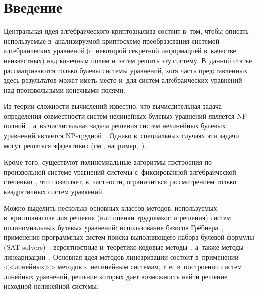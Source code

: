 
  
\vspace*{-1pt}



\thispagestyle{headings}

\begin{multicols}{2}

\label{st\stat}


\section{Введение}

\vspace*{-2pt}

Центральная идея алгебраического криптоанализа состоит в~том, чтобы описать 
используемые в~анализируемой криптосхеме преобразования сис\-те\-мой алгебраических 
уравнений (с~некоторой сек\-рет\-ной информацией в~качестве неизвестных) над\linebreak 
конечным полем и~затем решить эту систему.
В~данной статье рассматриваются только булевы системы уравнений, хотя часть 
пред\-став\-лен\-ных здесь результа\-тов может иметь место и~для сис\-тем ал\-геб\-ра\-и\-че\-ских 
уравнений над произвольными конечными полями.

Из теории сложности вычислений известно, что вычислительная задача определения 
совместности систем нелинейных булевых уравнений является NP-пол\-ной~\cite{GJ1982, GT2017}, 
а~вычислительная задача решения систем нелинейных булевых 
уравнений является NP-труд\-ной~\cite{GJ1982,GT2017}.
Однако в~специальных случаях эти задачи могут решаться эффективно (см., 
например,~\cite{GT2017,Smi2000}).

Кроме того, существуют полиномиальные алгоритмы построения по произвольной 
системе уравнений системы с~фиксированной алгебраической 
степенью~\cite[\S{}.2]{Bard2009}, что позволяет, в~частности, ограничиться 
рассмотрением только квадратичных систем уравнений.

Можно выделить несколько основных классов методов, используемых в~криптоанализе 
для решения (или оценки трудоемкости решения) систем полиномиальных булевых 
уравнений:
использование базисов Грёбнера~\cite[section~12.2]{Bard2009}, применение 
программных систем поиска выполняющего набора булевой формулы 
(SAT-solvers)~\cite{BCJ2007}, вероятностные и~тео\-ре\-ти\-ко-ко\-до\-вые 
методы~\cite{LSSYa2015}, а~также  методы линеаризации~\cite[section~12.3]{Bard2009}.
Основная идея методов линеаризации состоит в~применении <<линейных>> методов 
к~нелинейным системам, т.\,е.\ в~построении сис\-тем линейных уравнений, решение 
которых дает возможность найти решение исходной нелинейной системы.


\end{multicols}
